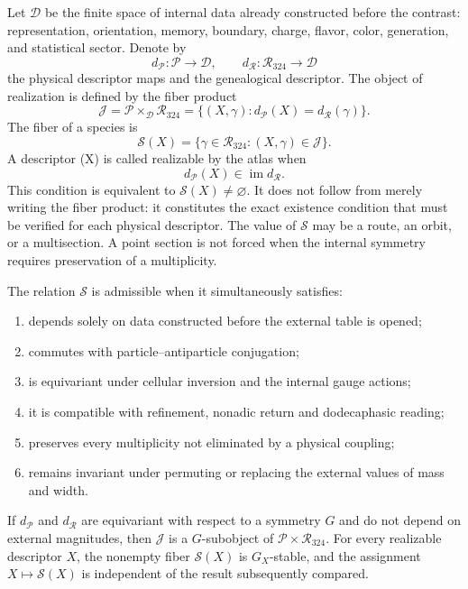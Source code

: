 Let \(\mathcal D\) be the finite space of internal data already constructed before the
contrast: representation, orientation, memory, boundary, charge, flavor,
color, generation, and statistical sector. Denote by
\[
 d_{\mathcal P}:\mathcal P\longrightarrow\mathcal D,
 \qquad
 d_{\mathcal R}:\mathcal R_{324}\longrightarrow\mathcal D
\]
the physical descriptor maps and the genealogical descriptor. The object
of realization is defined by the fiber product
\[
 \mathcal J
 =\mathcal P\times_{\mathcal D}\mathcal R_{324}
 =\{(X,\gamma):d_{\mathcal P}(X)=d_{\mathcal R}(\gamma)\}.
\]
The fiber of a species is
\[
\mathscr S(X)=\{\gamma\in\mathcal R_{324}:(X,\gamma)\in\mathcal J\}.
\]
A descriptor (X) is called realizable by the atlas when
\[
 d_{\mathcal P}(X)\in\operatorname{im}d_{\mathcal R}.
\]
This condition is equivalent to \(\mathscr S(X)\ne\varnothing\). It does not follow from merely writing the fiber product: it constitutes the exact existence condition that must be verified for each physical descriptor. The value of \(\mathscr S\) may be a route, an orbit, or a multisection. A point section is not forced when the internal symmetry requires preservation of a multiplicity.

\begin{definition}
The relation \(\mathscr S\) is admissible when it simultaneously satisfies:
\begin{enumerate}
\item depends solely on data constructed before the external table is opened;
\item commutes with particle--antiparticle conjugation;
\item is equivariant under cellular inversion and the internal
      gauge actions;
\item it is compatible with refinement, nonadic return and dodecaphasic
      reading;
\item preserves every multiplicity not eliminated by a physical coupling;
\item remains invariant under permuting or replacing the external values of
      mass and width.
\end{enumerate}
\end{definition}

\begin{theorem}
If \(d_{\mathcal P}\) and \(d_{\mathcal R}\) are equivariant with respect to a symmetry \(G\) and do not depend on external magnitudes, then \(\mathcal J\) is a \(G\)-subobject of \(\mathcal P\times\mathcal R_{324}\). For every realizable descriptor \(X\), the nonempty fiber \(\mathscr S(X)\) is \(G_X\)-stable, and the assignment \(X\mapsto\mathscr S(X)\) is independent of the result subsequently compared.
\end{theorem}


